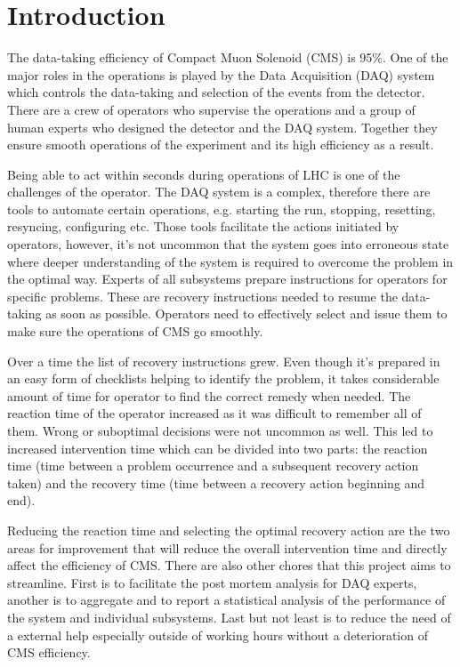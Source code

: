 \documentclass[a4paper]{jpconf}
\begin{document}
\section{Introduction}
The data-taking efficiency of Compact Muon Solenoid (CMS) is 95\%. One of the major roles in the operations is played by the Data Acquisition (DAQ) system which controls the data-taking and selection of the events from the detector. There are a crew of operators who supervise the operations and a group of human experts who designed the detector and the DAQ system. Together they ensure smooth operations of the experiment and its high efficiency as a result.

Being able to act within seconds during operations of LHC is one of the challenges of the operator. The DAQ system is a complex, therefore there are tools to automate certain operations, e.g. starting the run, stopping, resetting, resyncing, configuring etc. Those tools facilitate the actions initiated by operators, however, it's not uncommon that the system goes into erroneous state where deeper understanding of the system is required to overcome the problem in the optimal way. Experts of all subsystems prepare instructions for operators for specific problems. These are recovery instructions needed to resume the data-taking as soon as possible. Operators need to effectively select and issue them to make sure the operations of CMS go smoothly.

Over a time the list of recovery instructions grew. Even though it's prepared in an easy form of checklists helping to identify the problem, it takes considerable amount of time for operator to find the correct remedy when needed. The reaction time of the operator increased as it was difficult to remember all of them. Wrong or suboptimal decisions were not uncommon as well. This led to increased intervention time which can be divided into two parts: the reaction time (time between a problem occurrence and a subsequent recovery action taken) and the recovery time (time between a recovery action beginning and end). 

Reducing the reaction time and selecting the optimal recovery action are the two areas for improvement that will reduce the overall intervention time and directly affect the efficiency of CMS. There are also other chores that this project aims to streamline. First is to facilitate the post mortem analysis for DAQ experts, another is to aggregate and to report a statistical analysis of the performance of the system and individual subsystems. Last but not least is to reduce the need of a external help especially outside of working hours without a deterioration of CMS efficiency. 
\end{document}
